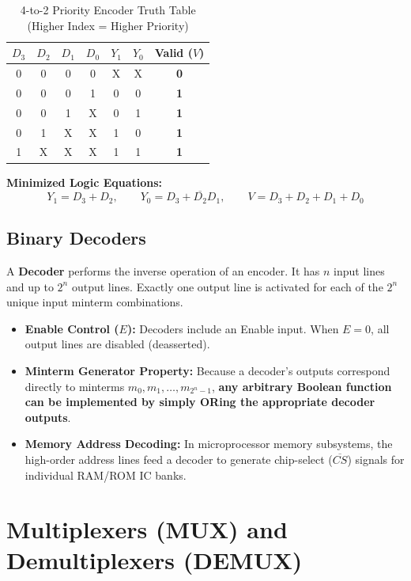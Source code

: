\begin{table}[htbp]
\centering
\small
\caption{4-to-2 Priority Encoder Truth Table (Higher Index = Higher Priority)}
\label{tab:priority_encoder}
\begin{tabular}{c c c c c c c}
\toprule
$D_3$ & $D_2$ & $D_1$ & $D_0$ & $Y_1$ & $Y_0$ & \textbf{Valid ($V$)} \\
\midrule
0 & 0 & 0 & 0 & X & X & \textbf{0} \\
0 & 0 & 0 & 1 & 0 & 0 & \textbf{1} \\
0 & 0 & 1 & X & 0 & 1 & \textbf{1} \\
0 & 1 & X & X & 1 & 0 & \textbf{1} \\
1 & X & X & X & 1 & 1 & \textbf{1} \\
\bottomrule
\end{tabular}
\end{table}

\textbf{Minimized Logic Equations:}
\begin{equation}
\label{eq:priority_encoder_eqs}
Y_1 = D_3 + D_2, \qquad Y_0 = D_3 + \overline{D_2} D_1, \qquad V = D_3 + D_2 + D_1 + D_0
\end{equation}

\subsection{Binary Decoders}
A \textbf{Decoder} performs the inverse operation of an encoder. It has $n$ input lines and up to $2^n$ output lines. Exactly one output line is activated for each of the $2^n$ unique input minterm combinations.
\begin{itemize}
    \item \textbf{Enable Control ($E$):} Decoders include an Enable input. When $E=0$, all output lines are disabled (deasserted).
    \item \textbf{Minterm Generator Property:} Because a decoder's outputs correspond directly to minterms $m_0, m_1, \dots, m_{2^n-1}$, \textbf{any arbitrary Boolean function can be implemented by simply ORing the appropriate decoder outputs}.
    \item \textbf{Memory Address Decoding:} In microprocessor memory subsystems, the high-order address lines feed a decoder to generate chip-select ($\overline{CS}$) signals for individual RAM/ROM IC banks.
\end{itemize}


\section{Multiplexers (MUX) and Demultiplexers (DEMUX)}
\label{sec:mux_demux}

